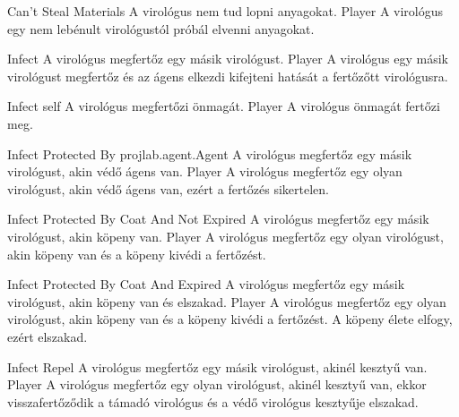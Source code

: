 \begin{use-case}
    {Can't Steal Materials}
    {A virológus nem tud lopni anyagokat.}
    {Player}
    A virológus egy nem lebénult virológustól próbál elvenni anyagokat.
\end{use-case}

\begin{use-case}
    {Infect}
    {A virológus megfertőz egy másik virológust.}
    {Player}
    A virológus egy másik virológust megfertőz és az ágens elkezdi kifejteni hatását a fertőzőtt virológusra.
\end{use-case}

\begin{use-case}
    {Infect self}
    {A virológus megfertőzi önmagát.}
    {Player}
    A virológus önmagát fertőzi meg.
\end{use-case}

\begin{use-case}
    {Infect Protected By projlab.agent.Agent}
    {A virológus megfertőz egy másik virológust, akin védő ágens van.}
    {Player}
    A virológus megfertőz egy olyan virológust, akin védő ágens van, ezért a fertőzés sikertelen.
\end{use-case}

\begin{use-case}
    {Infect Protected By Coat And Not Expired}
    {A virológus megfertőz egy másik virológust, akin köpeny van.}
    {Player}
    A virológus megfertőz egy olyan virológust, akin köpeny van és a köpeny kivédi a fertőzést.
\end{use-case}

\begin{use-case}
    {Infect Protected By Coat And Expired}
    {A virológus megfertőz egy másik virológust, akin köpeny van és elszakad.}
    {Player}
    A virológus megfertőz egy olyan virológust, akin köpeny van és a köpeny kivédi a fertőzést. A köpeny élete elfogy, ezért elszakad.
\end{use-case}

\begin{use-case}
    {Infect Repel}
    {A virológus megfertőz egy másik virológust, akinél kesztyű van.}
    {Player}
    A virológus megfertőz egy olyan virológust, akinél kesztyű van, ekkor visszafertőződik a támadó virológus és a védő virológus kesztyűje elszakad.
\end{use-case}


